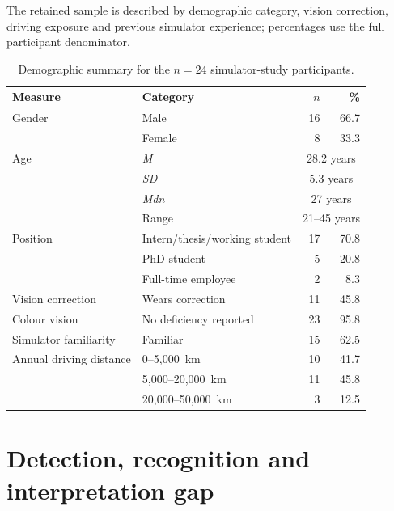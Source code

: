 \documentclass[
english,                 %
bibtex,                  %
includeExtraAbstracts, %
]{kththesis}
\newenvironment{evidenceblock}{\par\addvspace{6pt}\noindent\begin{minipage}{\linewidth}}{\end{minipage}\par\addvspace{6pt}}
\numberwithin{listing}{chapter}
\begin{document}
\begin{evidenceblock}
\normalsize
The retained sample is described by demographic category, vision correction, driving exposure and previous simulator experience; percentages use the full participant denominator.

\begin{table}[H]
\centering
\scriptsize
\caption[Demographic summary]{Demographic summary for the $n = 24$ simulator-study participants.}
\label{tab:demographics}
\begin{tabular}{llrr}
\toprule
Measure & Category & \(n\) & \% \\ \midrule
Gender & Male & 16 & 66.7 \\
 & Female & 8 & 33.3 \\
Age & \textit{M} & \multicolumn{2}{c}{28.2 years} \\
 & \textit{SD} & \multicolumn{2}{c}{5.3 years} \\
 & \textit{Mdn} & \multicolumn{2}{c}{27 years} \\
 & Range & \multicolumn{2}{c}{21--45 years} \\
Position & Intern/thesis/working student & 17 & 70.8 \\
 & PhD student & 5 & 20.8 \\
 & Full-time employee & 2 & 8.3 \\
Vision correction & Wears correction & 11 & 45.8 \\
Colour vision & No deficiency reported & 23 & 95.8 \\
Simulator familiarity & Familiar & 15 & 62.5 \\
Annual driving distance & 0--5,000~km & 10 & 41.7 \\
 & 5,000--20,000~km & 11 & 45.8 \\
 & 20,000--50,000~km & 3 & 12.5 \\
\bottomrule
\end{tabular}
\end{table}
\end{evidenceblock}

\section{Detection, recognition and interpretation gap}
\label{app:cross-rq-tables}
\end{document}
